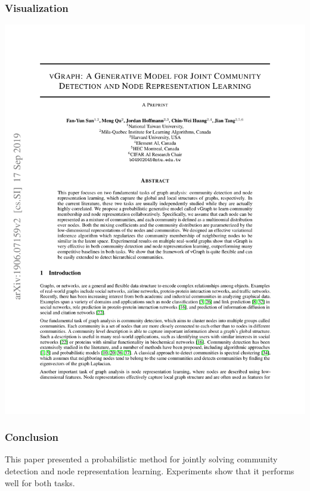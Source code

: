 \documentclass[12pt,aspectratio=169]{beamer}
\begin{document}
    \begin{frame}
        \frametitle{Visualization}

        \centering
        \includegraphics[page=8,trim=2.5cm 18.5cm 2.5cm 2cm,clip,scale=.8]{vGraph.pdf}
    \end{frame}
    
    \appendix

    \begin{frame}
        \frametitle{Conclusion}

        This paper presented a probabilistic method for jointly solving community detection and node representation
        learning. Experiments show that it performs well for both tasks.
    \end{frame}

\end{document}
